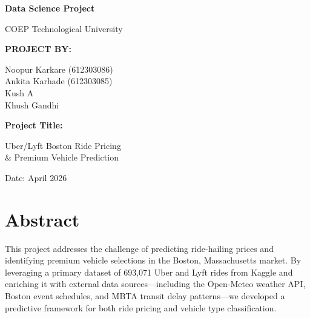 \documentclass[12pt,a4paper]{article}
\begin{document}
\begin{titlepage}
\centering
\vspace*{2cm}
{\LARGE\bfseries Data Science Project\par}
\vspace{2cm}
{\Large COEP Technological University\par}
\vspace{1.5cm}
{\large\bfseries PROJECT BY:\par}
\vspace{0.5cm}
{\large
Noopur Karkare (612303086)\\
Ankita Karhade (612303085)\\
Kush A\\
Khush Gandhi\par}
\vspace{2cm}
{\Large\bfseries Project Title:\par}
\vspace{0.3cm}
{\LARGE Uber/Lyft Boston Ride Pricing\\ \& Premium Vehicle Prediction\par}
\vspace{2cm}
{\large Date: April 2026\par}
\vfill
\end{titlepage}

\tableofcontents
\newpage

\section{Abstract}

This project addresses the challenge of predicting ride-hailing prices and identifying premium vehicle selections in the Boston, Massachusetts market. By leveraging a primary dataset of 693,071 Uber and Lyft rides from Kaggle and enriching it with external data sources---including the Open-Meteo weather API, Boston event schedules, and MBTA transit delay patterns---we developed a predictive framework for both ride pricing and vehicle type classification.
\end{document}
